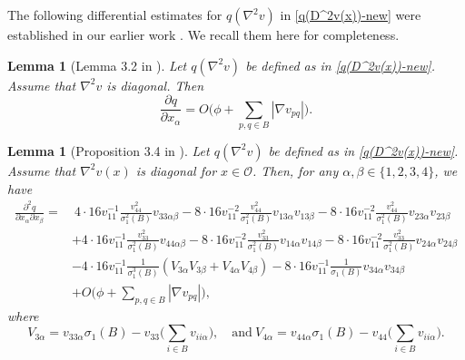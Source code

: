 \documentclass[11pt]{amsart}
\newtheorem{lemma}[theorem]{Lemma}
\numberwithin{theorem}{section}
\numberwithin{equation}{section}
\begin{document}
The following differential estimates for $q(\nabla^2v)$ in \eqref{q(D^2v(x))-new} were established in our earlier work \cite{Zhang-Zhou2025}. We recall them here for completeness.
\begin{lemma}[Lemma 3.2 in \cite{Zhang-Zhou2025}]\label{Lemma-first derivative of q}
Let $q(\nabla^2v)$ be defined as in \eqref{q(D^2v(x))-new}. Assume that $\nabla^2v$ is diagonal. Then
$$\frac{\partial q}{\partial x_\alpha}=O\bigg(\phi+\sum_{p,q\in B}|\nabla v_{pq}|\bigg).$$
\end{lemma}
\begin{lemma}[Proposition 3.4 in \cite{Zhang-Zhou2025}]\label{Lemma-q_{ij}}
Let $q(\nabla^2v)$ be defined as in \eqref{q(D^2v(x))-new}. Assume that $\nabla^2v(x)$ is diagonal for $x\in\mathcal{O}$. Then, for any $\alpha,\beta\in\{1,2,3,4\}$, we have
\begin{align*}
\frac{\partial^2q}{\partial x_\alpha\partial x_\beta}
=&~4\cdot 16v_{11}^{-1}\frac{v_{44}^2}{\sigma_1^2(B)}v_{33\alpha\beta}-8\cdot 16v_{11}^{-2}\frac{v_{44}^2}{\sigma_1^2(B)}v_{13\alpha}v_{13\beta}-8\cdot 16v_{11}^{-2}\frac{v_{44}^2}{\sigma_1^2(B)}v_{23\alpha}v_{23\beta}\\
&+4\cdot16v_{11}^{-1}\frac{v_{33}^2}{\sigma_1^2(B)}v_{44\alpha\beta}-8\cdot 16v_{11}^{-2}\frac{v_{33}^2}{\sigma_1^2(B)}v_{14\alpha}v_{14\beta}-8\cdot16v_{11}^{-2}\frac{v_{33}^2}{\sigma_1^2(B)}v_{24\alpha}v_{24\beta}\\
&-4\cdot16v_{11}^{-1}\frac{1}{\sigma_1^3(B)}(V_{3\alpha}V_{3\beta}+V_{4\alpha}V_{4\beta})-8\cdot16v_{11}^{-1}\frac{1}{\sigma_1(B)}v_{34\alpha}v_{34\beta}\\
&+O\bigg(\phi+\sum_{p,q\in B}|\nabla v_{pq}|\bigg),
\end{align*}
where $$V_{3\alpha}=v_{33\alpha}\sigma_1(B)-v_{33}\bigg(\sum_{i\in B}v_{ii\alpha}\bigg),\quad\mathrm{and}\ V_{4\alpha}=v_{44\alpha}\sigma_1(B)-v_{44}\bigg(\sum_{i\in B}v_{ii\alpha}\bigg).$$
\end{lemma}
\end{document}
